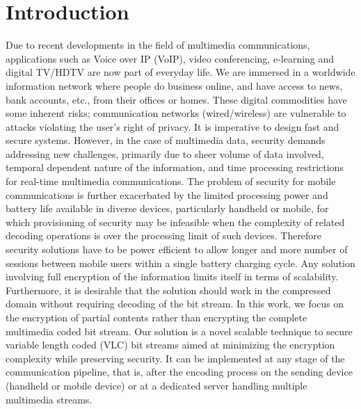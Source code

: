\documentclass[preprint]{elsarticle}
\begin{document}
\section{Introduction}
Due to recent developments in the field of multimedia communications, applications such as Voice over IP (VoIP), video conferencing, e-learning and digital TV/HDTV are now part of everyday life. We are immersed in a worldwide information network where people do business online, and have access to news, bank accounts, etc., from their offices or homes. These digital commodities have some inherent risks; communication networks (wired/wireless) are vulnerable to attacks violating the user's right of privacy. It is imperative to design fast and secure systems. However, in the case of multimedia data, security demands addressing new challenges, primarily due to sheer volume of data involved, temporal dependent nature of the information, and time processing restrictions for real-time multimedia communications. The problem of security for mobile communications is further exacerbated by the limited processing power and battery life available in diverse devices, particularly handheld or mobile, for which provisioning of security may be infeasible when the complexity of related decoding operations is over the processing limit of such devices. Therefore security solutions have to be power efficient to allow longer and more number of sessions between mobile users within a single battery charging cycle. Any solution involving full encryption of the information limits itself in terms of scalability. Furthermore, it is desirable that the solution should work in the compressed domain without requiring decoding of the bit stream. In this work, we focus on the encryption of partial contents rather than encrypting the complete multimedia coded bit stream. Our solution is a novel scalable technique to secure variable length coded (VLC) bit streams aimed at minimizing the encryption complexity while preserving security. It can be implemented at any stage of the communication pipeline, that is, after the encoding process on the sending device (handheld or mobile device) or at a dedicated server handling multiple multimedia streams. 
\end{document}
